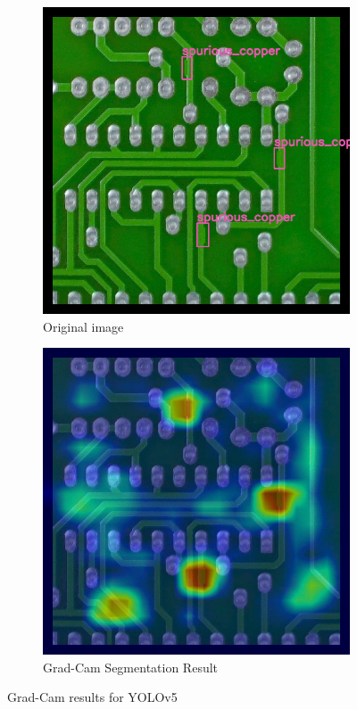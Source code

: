 \documentclass[12pt]{article}
\begin{document}
\begin{figure}[h]
    \centering
    \begin{subfigure}[b]{0.45\textwidth}
        \centering
        \includegraphics[width=\textwidth]{./graphics/testing_gradcam_yolo.png}
        \caption{Original image}
        \label{fig:image1}
    \end{subfigure}
    \hfill
    \begin{subfigure}[b]{0.45\textwidth}
        \centering
        \includegraphics[width=\textwidth]{./graphics/gradcam_yolo.png}
        \caption{Grad-Cam Segmentation Result}
        \label{fig:image2}
    \end{subfigure}
    \caption{Grad-Cam results for YOLOv5}
    \label{fig:gradcam_yolo}
\end{figure}
\end{document}
